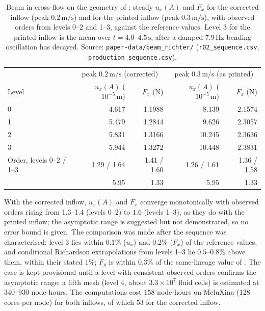 \documentclass[sn-mathphys,Numbered]{sn-jnl}%
\begin{document}
\begin{appendices}
\begin{table}[htbp]
	\centering
	\footnotesize
	\caption{Beam in cross-flow on the geometry of \citet{Richter2012}: steady $u_x(A)$ and $F_x$ for the corrected inflow (peak $0.2\,\mathrm{m/s}$) and for the printed inflow (peak $0.3\,\mathrm{m/s}$), with observed orders from levels 0--2 and 1--3, against the reference values. Level 3 for the printed inflow is the mean over $t = 4.0$--$4.5\,\mathrm{s}$, after a damped $7.9\,\mathrm{Hz}$ bending oscillation has decayed. Source: \texttt{paper-data/beam\_richter/} (\texttt{r02\_sequence.csv}, \texttt{production\_sequence.csv}).}
	\label{tab:beam_seq}
	\begin{tabular}{lrrrr}
		\toprule
		& \multicolumn{2}{c}{peak $0.2\,\mathrm{m/s}$ (corrected)} & \multicolumn{2}{c}{peak $0.3\,\mathrm{m/s}$ (as printed)} \\
		Level & $u_x(A)$ ($10^{-5}\,\mathrm{m}$) & $F_x$ (N) & $u_x(A)$ ($10^{-5}\,\mathrm{m}$) & $F_x$ (N) \\
		\midrule
		0 & 4.617 & 1.1988 & 8.139 & 2.1574 \\
		1 & 5.479 & 1.2844 & 9.626 & 2.3057 \\
		2 & 5.831 & 1.3166 & 10.245 & 2.3636 \\
		3 & 5.944 & 1.3272 & 10.448 & 2.3831 \\
		\midrule
		Order, levels 0--2 / 1--3 & 1.29 / 1.64 & 1.41 / 1.60 & 1.26 / 1.61 & 1.36 / 1.58 \\
		\citet{Richter2012} & 5.95 & 1.33 & 5.95 & 1.33 \\
		\bottomrule
	\end{tabular}
\end{table}

With the corrected inflow, $u_x(A)$ and $F_x$ converge monotonically with observed orders rising from 1.3--1.4 (levels 0--2) to 1.6 (levels 1--3), as they do with the printed inflow; the asymptotic range is suggested but not demonstrated, so no error bound is given.
The comparison was made after the sequence was characterised: level 3 lies within $0.1\%$ ($u_x$) and $0.2\%$ ($F_x$) of the reference values, and conditional Richardson extrapolations from levels 1--3 lie $0.5$--$0.8\%$ above them, within their stated $1\%$; $F_y$ is within $0.3\%$ of the same-lineage value of \citet{Tukovic2018}.
The case is kept provisional until a level with consistent observed orders confirms the asymptotic range; a fifth mesh (level 4, about $3.3\times10^{7}$ fluid cells) is estimated at $340$--$930$ node-hours.
The computations cost $158$ node-hours on MeluXina (128 cores per node) for both inflows, of which $53$ for the corrected inflow.






\end{appendices}
\end{document}
